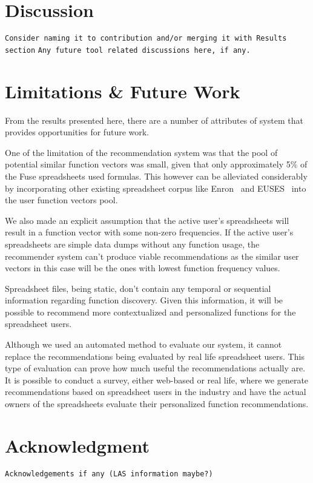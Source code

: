 \documentclass[conference]{IEEEtran}
\begin{document}
\section{Discussion}
\texttt{Consider naming it to contribution and/or merging it with Results section}
\texttt{Any future tool related discussions here, if any.}

\section{Limitations \& Future Work}
From the results presented here, there are a number of attributes of system that provides opportunities for future work.

One of the limitation of the recommendation system was that the pool of potential similar function vectors was small, given that only approximately 5\% of the Fuse spreadsheets used formulas. This however can be alleviated considerably by incorporating other existing spreadsheet corpus like Enron~\cite{hermans2014enron} and EUSES~\cite{fisher2005euses} into the user function vectors pool.

We also made an explicit assumption that the active user's spreadsheets will result in a function vector with some non-zero frequencies. If the active user's spreadsheets are simple data dumps without any function usage, the recommender system can't produce viable recommendations as the similar user vectors in this case will be the ones with lowest function frequency values.

Spreadsheet files, being static, don't contain any temporal or sequential information regarding function discovery. Given this information, it will be possible to recommend more contextualized and personalized functions for the spreadsheet users.

Although we used an automated method to evaluate our system, it cannot replace the recommendations being evaluated by real life spreadsheet users. This type of evaluation can prove how much useful the recommendations actually are. It is possible to conduct a survey, either web-based or real life, where we generate recommendations based on spreadsheet users in the industry and have the actual owners of the spreadsheets evaluate their personalized function recommendations.

\section*{Acknowledgment}
\texttt{Acknowledgements if any (LAS information maybe?)}
\end{document}

